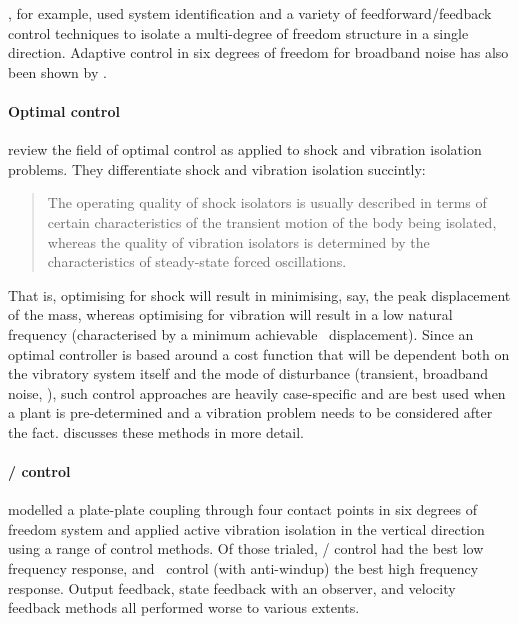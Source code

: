 \textcite{guo2005}, for example, used system identification and a variety of feedforward/feedback control techniques to isolate a multi-degree of freedom structure in a single direction.
Adaptive control in six degrees of freedom for broadband noise has also been shown by \textcite{duindam2005}.


\paragraph{Optimal control}

\textcite{balandin1998} review the field of optimal control as applied to shock and vibration isolation problems.
They differentiate shock and vibration isolation succintly:
\begin{quote}
The operating quality of shock isolators is usually described in terms of certain characteristics of the transient motion of the body being isolated, whereas the quality of vibration isolators is determined by the characteristics of steady-state forced oscillations.
\end{quote}
That is, optimising for shock will result in minimising, say, the peak displacement of the mass, whereas optimising for vibration will result in a low natural frequency (characterised by a minimum achievable \RMS\ displacement).
Since an optimal controller is based around a cost function that will be dependent both on the vibratory system itself and the mode of disturbance (transient, broadband noise, \etc), such control approaches are heavily case-specific and are best used when a plant is pre-determined and a vibration problem needs to be considered after the fact.
\textcite{bolotnik2001} discusses these methods in more detail.

\paragraph{\Hinf/ control}

\textcite{kerber2007} modelled a plate-plate coupling through four contact points in six degrees of freedom system and applied active vibration isolation in the vertical direction using a range of control methods.
Of those trialed, \Hinf/ control had the best low frequency response, and \PI\ control (with anti-windup) the best high frequency response.
Output feedback, state feedback with an observer, and velocity feedback methods all performed worse to various extents.

